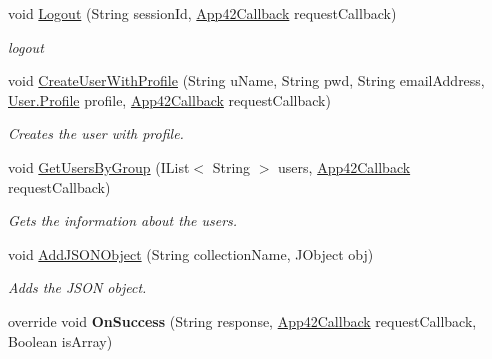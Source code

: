 \begin{DoxyCompactItemize}
\item 
void \hyperlink{classcom_1_1shephertz_1_1app42_1_1paas_1_1sdk_1_1windows_1_1user_1_1_user_service_aefd25331c41b793a80018d78b1c74fd4}{Logout} (String session\+Id, \hyperlink{interfacecom_1_1shephertz_1_1app42_1_1paas_1_1sdk_1_1windows_1_1_app42_callback}{App42\+Callback} request\+Callback)
\begin{DoxyCompactList}\small\item\em logout \end{DoxyCompactList}\item 
void \hyperlink{classcom_1_1shephertz_1_1app42_1_1paas_1_1sdk_1_1windows_1_1user_1_1_user_service_a792e00b88fd404569a82d5f0ecb798b1}{Create\+User\+With\+Profile} (String u\+Name, String pwd, String email\+Address, \hyperlink{classcom_1_1shephertz_1_1app42_1_1paas_1_1sdk_1_1windows_1_1user_1_1_user_1_1_profile}{User.\+Profile} profile, \hyperlink{interfacecom_1_1shephertz_1_1app42_1_1paas_1_1sdk_1_1windows_1_1_app42_callback}{App42\+Callback} request\+Callback)
\begin{DoxyCompactList}\small\item\em Creates the user with profile. \end{DoxyCompactList}\item 
void \hyperlink{classcom_1_1shephertz_1_1app42_1_1paas_1_1sdk_1_1windows_1_1user_1_1_user_service_a7c919c38330ba1d2bb3a2cc4e4036d6a}{Get\+Users\+By\+Group} (I\+List$<$ String $>$ users, \hyperlink{interfacecom_1_1shephertz_1_1app42_1_1paas_1_1sdk_1_1windows_1_1_app42_callback}{App42\+Callback} request\+Callback)
\begin{DoxyCompactList}\small\item\em Gets the information about the users. \end{DoxyCompactList}\item 
void \hyperlink{classcom_1_1shephertz_1_1app42_1_1paas_1_1sdk_1_1windows_1_1user_1_1_user_service_a87eb83fbcaf864d7ff3223ec06d85261}{Add\+J\+S\+O\+N\+Object} (String collection\+Name, J\+Object obj)
\begin{DoxyCompactList}\small\item\em Adds the J\+S\+O\+N object. \end{DoxyCompactList}\item 
\hypertarget{classcom_1_1shephertz_1_1app42_1_1paas_1_1sdk_1_1windows_1_1user_1_1_user_service_ae7c6fcbdfd9b71ec561e4231fb571063}{override void {\bfseries On\+Success} (String response, \hyperlink{interfacecom_1_1shephertz_1_1app42_1_1paas_1_1sdk_1_1windows_1_1_app42_callback}{App42\+Callback} request\+Callback, Boolean is\+Array)}\label{classcom_1_1shephertz_1_1app42_1_1paas_1_1sdk_1_1windows_1_1user_1_1_user_service_ae7c6fcbdfd9b71ec561e4231fb571063}


\end{DoxyCompactItemize}
